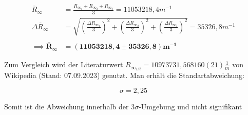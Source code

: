 \documentclass{article}
\begin{document}
\begin{equation}
    \begin{split}
        \overline{R}_{\infty} &= \frac{R_{\infty_{1}} + R_{\infty_{2}} + R_{\infty_{3}}}{3} = 11053218,4 m^{-1} \\
        \Delta \overline{R}_{\infty} &= \sqrt{\left( \frac{\Delta R_{\infty_{1}}}{3} \right)^2 + \left( \frac{\Delta R_{\infty_{2}}}{3} \right)^2 + \left( \frac{\Delta R_{\infty_{3}}}{3} \right)^2} = 35326,8 m^{-1} \\ \\
        \implies \bm{\overline{R}_{\infty}} &= \bm{(11053218,4 \pm 35326,8) m^{-1}}
    \end{split}
\end{equation}

Zum Vergleich wird der Literaturwert $R_{\infty_{Lit}} = 10973731,568160(21) \frac{1}{m}$ von Wikipedia (Stand: 07.09.2023) genutzt. Man erhält die Standartabweichung:

\begin{equation}
    \sigma = 2,25
\end{equation}

Somit ist die Abweichung innerhalb der $3\sigma$-Umgebung und nicht signifikant
\end{document}
